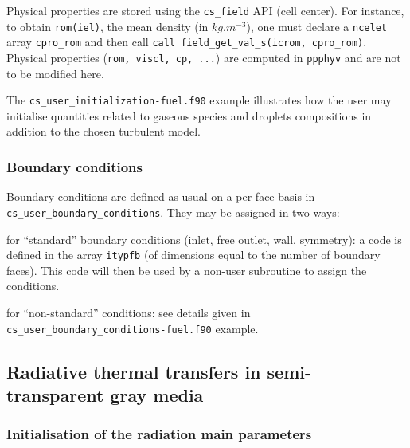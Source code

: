 {{{Physical properties are stored using the \texttt{cs\_field} API (cell center). For instance, to obtain \texttt{rom(iel)},
the mean density (in $kg.m^{-3}$), one must declare a \texttt{ncelet} array \texttt{cpro\_rom} and then call
\texttt{call field\_get\_val\_s(icrom, cpro\_rom)}.\\
Physical properties (\texttt{rom, viscl, cp, ...}) are computed in \texttt{ppphyv} and are not to be modified here.

The \texttt{cs\_user\_initialization-fuel.f90} example illustrates how the user
may initialise quantities related to gaseous species and droplets compositions
in addition to the chosen turbulent model.

\subsubsection{Boundary conditions}
Boundary conditions are defined as usual on a per-face basis in
\texttt{cs\_user\_boundary\_conditions}. They may be assigned in two ways:
\begin{list}{.}{}
\item for ``standard'' boundary conditions (inlet, free outlet, wall, symmetry): a code is defined in the array \texttt{itypfb} (of dimensions equal to the number of boundary faces). This code will then be used by a non-user subroutine to assign the conditions.
\item for ``non-standard'' conditions: see details given in
  \texttt{cs\_user\_boundary\_conditions-fuel.f90} example.
\end{list}

\subsection{Radiative thermal transfers in semi-transparent gray media}
\subsubsection{Initialisation of the radiation main parameters}

}}}
